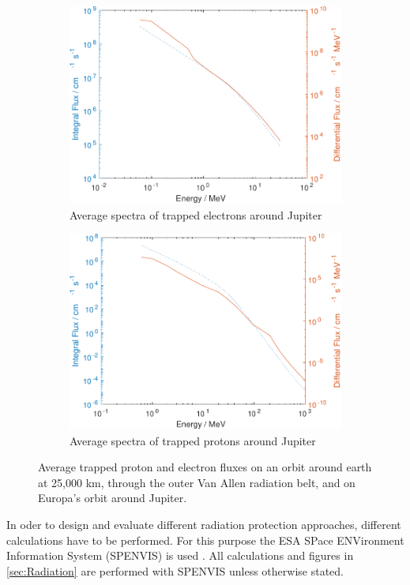 \begin{figure}[htb]
\begin{subfigure}[b]{0.475\textwidth}
         \centering
         \includegraphics[width=\textwidth]{Media/J_Electron_Flux}
         \caption{Average spectra of trapped electrons around Jupiter}
         \label{fig:trappedelectronsJupiter}
     \end{subfigure}
     \hfill
     \begin{subfigure}[b]{0.475\textwidth}
         \centering
         \includegraphics[width=\textwidth]{Media/J_Proton_Flux}
         \caption{Average spectra of trapped protons around Jupiter}
         \label{fig:trappedprotonsJupiter}
     \end{subfigure}
        \caption{Average trapped proton and electron fluxes on an orbit around earth at 25,000 km, through the outer Van Allen radiation belt, and on Europa's orbit around Jupiter.}
        \label{fig:trappedprotonelectronfluxes}
\end{figure}

In oder to design and evaluate different radiation protection approaches, different calculations have to be performed. For this purpose the ESA SPace ENVironment Information System (SPENVIS) is used \cite{Platzhalter}. All calculations and figures in \autoref{sec:Radiation} are performed with SPENVIS unless otherwise stated.

\cleardoublepage